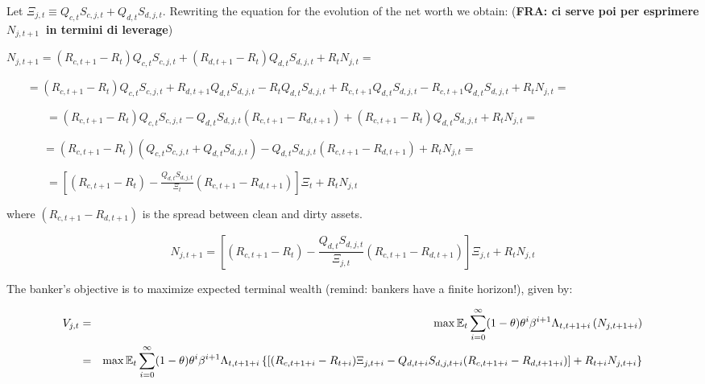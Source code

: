 \documentclass{article}
\begin{document}
Let $\Xi _{j,t}\equiv Q_{c,t}S_{c,j,t}+Q_{d,t}S_{d,j,t}$. Rewriting the
equation for the evolution of the net worth we obtain: (\textbf{FRA: ci
serve poi per esprimere }$N_{j,t+1}$\textbf{\ in termini di leverage})

$%
N_{j,t+1}=(R_{c,t+1}-R_{t})Q_{c,t}S_{c,j,t}+(R_{d,t+1}-R_{t})Q_{d,t}S_{d,j,t}+R_{t}N_{j,t}= 
$

$\ \ \ \ \ \ \ \
=(R_{c,t+1}-R_{t})Q_{c,t}S_{c,j,t}+R_{d,t+1}Q_{d,t}S_{d,j,t}-R_{t}Q_{d,t}S_{d,j,t}+R_{c,t+1}Q_{d,t}S_{d,j,t}-R_{c,t+1}Q_{d,t}S_{d,j,t}+R_{t}N_{j,t}= 
$

\ \ \ \ \ \ \ $%
=(R_{c,t+1}-R_{t})Q_{c,t}S_{c,j,t}-Q_{d,t}S_{d,j,t}(R_{c,t+1}-R_{d,t+1})+(R_{c,t+1}-R_{t})Q_{d,t}S_{d,j,t}+R_{t}N_{j,t}= 
$

\ \ \ \ \ \ $\
=(R_{c,t+1}-R_{t})(Q_{c,t}S_{c,j,t}+Q_{d,t}S_{d,j,t})-Q_{d,t}S_{d,j,t}(R_{c,t+1}-R_{d,t+1})+R_{t}N_{j,t}= 
$

\ \ \ \ \ \ \ $=\left[ (R_{c,t+1}-R_{t})-\frac{Q_{d,t}S_{d,j,t}}{\Xi _{t}}%
(R_{c,t+1}-R_{d,t+1})\right] \Xi _{t}+R_{t}N_{j,t}$

where $(R_{c,t+1}-R_{d,t+1})$ is the spread between clean and dirty assets.

\begin{equation*}
N_{j,t+1}=\left[ (R_{c,t+1}-R_{t})-\frac{Q_{d,t}S_{d,j,t}}{\Xi _{j,t}}%
(R_{c,t+1}-R_{d,t+1})\right] \Xi _{j,t}+R_{t}N_{j,t}
\end{equation*}

The banker's objective is to maximize expected terminal wealth (remind:
bankers have a finite horizon!), given by:

\begin{eqnarray}
V_{j,t} &=&\max \mathbb{E}_{t}\sum_{i=0}^{\infty }(1-\theta )\theta
^{i}\beta ^{i+1}\Lambda _{t,t+1+i}\left( N_{j,t+1+i}\right)
\label{terminal wealth} \\
&=&\max \mathbb{E}_{t}\sum_{i=0}^{\infty }(1-\theta )\theta ^{i}\beta
^{i+1}\Lambda _{t,t+1+i}\left\{ \left[ (R_{c,t+1+i}-R_{t+i})\Xi
_{j,t+i}-Q_{d,t+i}S_{d,j,t+i}(R_{c,t+1+i}-R_{d,t+1+i})\right]
+R_{t+i}N_{j,t+i}\right\}  \notag
\end{eqnarray}
\end{document}
